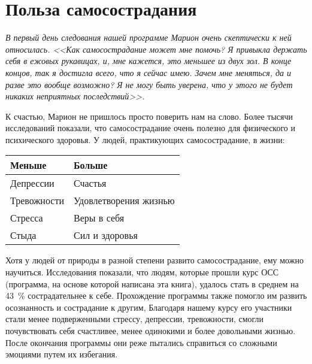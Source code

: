 
\chapter{Польза самосострадания} \label{The_Benefits_of_Self-Compassion}

\textit{В первый день следования нашей программе Марион очень скептически к ней относилась. <<Как самосострадание может мне помочь? Я привыкла держать себя в ежовых рукавицах, и, мне кажется, это меньшее из двух зол. В конце концов, так я достигла всего, что я сейчас имею. Зачем  мне меняться, да и разве это вообще возможно? Я не могу быть уверена, что у этого не будет никаких неприятных последствий>>.}

\vspace{2ex}

К счастью, Марион не пришлось просто поверить нам на слово. Более тысячи исследований показали, что самосострадание очень полезно для физического и психического здоровья. У людей, практикующих самосострадание, в жизни:

\begin{center}
	\setlength{\extrarowheight}{2mm}
	\begin{tabular}{p{4cm}p{5cm}}
		\textbf{Меньше} & \textbf{Больше} \\
		\hline \hline 
		Депрессии &	Счастья \\
		Тревожности	& Удовлетворения жизнью \\
		Стресса	& Веры в себя \\
		Стыда & Сил и здоровья \\
	\end{tabular}
	\setlength{\extrarowheight}{0mm}
\end{center}

\vspace{2ex}

Хотя у людей от природы в разной степени развито самосострадание, ему можно научиться. Исследования показали, что людям, которые прошли курс ОСС (программа, на основе которой написана эта книга), удалось стать в среднем на 43~\% сострадательнее к себе. Прохождение программы также помогло им развить осознанность и сострадание к другим, Благодаря нашему курсу его участники стали менее подверженными стрессу, депрессии, тревожности, смогли почувствовать себя счастливее, менее одинокими и более довольными жизнью. После окончания программы они реже пытались справиться со сложными эмоциями путем их избегания. 

